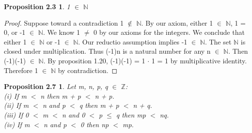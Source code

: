 \documentclass[12pt]{amsart}
\newcommand{\N}{\mathbb{N}}
\newcommand{\Z}{\mathbb{Z}}
\begin{document}
\newtheorem*{prop2.3}{Proposition 2.3}
\begin{prop2.3}
1 $\in$ $\N$
\end{prop2.3}

\begin{proof}
Suppose toward a contradiction 1 $\notin$ $\N$. By our axiom, either 1 $\in$ $\N$, 1 = 0, or -1 $\in$ $\N$. We know 1 $\neq$ 0 by our axioms for the integers. We conclude that either 1 $\in$ $\N$ or -1 $\in$ $\N$. Our reductio assumption implies -1 $\in$ $\N$. The set $\N$ is closed under multiplication. Thus (-1)n is a natural number for any n $\in$ $\N$. Then (-1)(-1) $\in$ $\N$. By proposition 1.20, (-1)(-1) = 1 $\cdot$ 1 = 1 by multiplicative identity. Therefore 1 $\in$ $\N$ by contradiction.
\end{proof}

\newtheorem*{prop2.7}{Proposition 2.7}
\begin{prop2.7}
Let m, n, p, q $\in$ $\Z$:
\\(i) If m $<$ n then m + p $<$ n + p.
\\(ii) If m $<$ n and p $<$ q then m + p $<$ n + q.
\\(iii) If 0 $<$ m $<$ n and 0 $<$ p $\leq$ q then mp $<$ nq.
\\(iv) If m $<$ n and p $<$ 0 then np $<$ mp.
\end{prop2.7}
\end{document}
